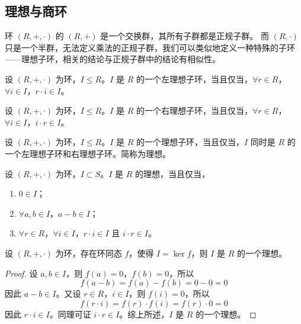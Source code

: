 \vspace{1em}
\subsection{理想与商环}

环 $(R,+,\cdot)$ 的 $(R,+)$ 是一个交换群，其所有子群都是正规子群。
而 $(R,\cdot)$ 只是一个半群，无法定义乘法的正规子群，我们可以类似地定义一种特殊的子环——理想子环，相关的结论与正规子群中的结论有相似性。

\vspace{1em}

\begin{definition}
    设 $(R,+,\cdot)$ 为环，$I \leq R$。$I$ 是 $R$ 的一个左理想子环，当且仅当，$\forall r\in R$，$\forall i\in I$，$r\cdot i \in I$。
\end{definition}

\begin{definition}
    设 $(R,+,\cdot)$ 为环，$I \leq R$。$I$ 是 $R$ 的一个右理想子环，当且仅当，$\forall r\in R$，$\forall i\in I$，$i\cdot r \in I$。
\end{definition}

\begin{definition}
    设 $(R,+,\cdot)$ 为环，$I \leq R$。$I$ 是 $R$ 的一个理想子环，当且仅当，$I$ 同时是 $R$ 的一个左理想子环和右理想子环。简称为理想。
    \label{def:ideal}
\end{definition}

\begin{definition}[理想的等价定义]
    设 $(R,+,\cdot)$ 为环，$I \subset S$。$I$ 是 $R$ 的理想，当且仅当，
    \begin{enumerate}
        \item $0\in I$；
        \item $\forall a,b\in I$，$a-b\in I$；
        \item $\forall r\in R$，$\forall i\in I$，$r\cdot i \in I$ 且 $i\cdot r \in I$。
    \end{enumerate}
\end{definition}

\begin{proposition}
    设 $(R,+,\cdot)$ 为环，存在环同态 $f$，使得 $I=\ker f$，则 $I$ 是 $R$ 的一个理想。
\end{proposition}
\begin{proof}
    设 $a,b\in I$，则 $f(a)=0$，$f(b)=0$，所以
    \[
        f(a-b)=f(a)-f(b)=0-0=0
    \]
    因此 $a-b\in I$。又设 $r\in R$，$i\in I$，则 $f(i)=0$，所以
    \[
        f(r\cdot i)=f(r)\cdot f(i)=f(r)\cdot 0=0
    \]
    因此 $r\cdot i \in I$。同理可证 $i\cdot r \in I$。综上所述，$I$ 是 $R$ 的一个理想。
\end{proof}

